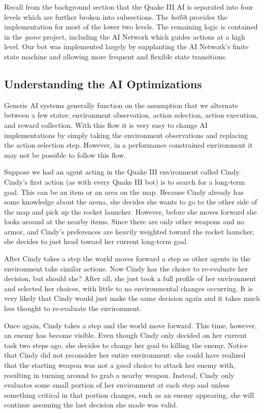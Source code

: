 Recall from the background section that the Quake III AI is separated into four levels which are further broken into subsections. The \emph{botlib} provides the implementation for most of the lower two levels. The remaining logic is contained in the \emph{game} project, including the AI Network which guides actions at a high level. Our bot was implemented largely by supplanting the AI Network's finite state machine and allowing more frequent and flexible state transitions.

\subsection{Understanding the AI Optimizations}

Generic AI systems generally function on the assumption that we alternate between a few states: environment observation, action selection, action execution, and reward collection. With this flow it is very easy to change AI implementations by simply taking the environment observations and replacing the action selection step. However, in a performance constrained environment it may not be possible to follow this flow.

Suppose we had an agent acting in the Quake III environment called Cindy. Cindy's first action (as with every Quake III bot) is to search for a long-term goal. This can be an item or an area on the map. Because Cindy already has some knowledge about the arena, she decides she wants to go to the other side of the map and pick up the rocket launcher. However, before she moves forward she looks around at the nearby items. Since there are only other weapons and no armor, and Cindy's preferences are heavily weighted toward the rocket launcher, she decides to just head toward her current long-term goal.

After Cindy takes a step the world moves forward a step as other agents in the environment take similar actions. Now Cindy has the choice to re-evaluate her decision, but should she? After all, she just took a full profile of her environment and selected her choices, with little to no environmental changes occurring. It is very likely that Cindy would just make the same decision again and it takes much less thought to re-evaluate the environment.

Once again, Cindy takes a step and the world move forward. This time, however, an enemy has become visible. Even though Cindy only decided on her current task two steps ago, she decides to change her goal to killing the enemy. Notice that Cindy did not reconsider her entire environment: she could have realized that the starting weapon was not a good choice to attack her enemy with, resulting in turning around to grab a nearby weapon. Instead, Cindy only evaluates some small portion of her environment at each step and unless something critical in that portion changes, such as an enemy appearing, she will continue assuming the last decision she made was valid.

